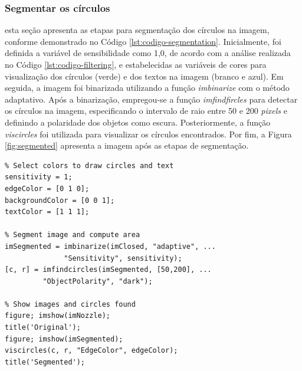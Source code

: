 \documentclass[conference]{IEEEtran}
\begin{document}
\subsubsection{Segmentar os círculos} esta seção apresenta as etapas para segmentação dos círculos na imagem, conforme demonstrado no Código \ref{lst:codigo-segmentation}. Inicialmente, foi definida a variável de sensibilidade como 1,0, de acordo com a análise realizada no Código \ref{lst:codigo-filtering}, e estabelecidas as variáveis de cores para visualização dos círculos (verde) e dos textos na imagem (branco e azul). Em seguida, a imagem foi binarizada utilizando a função \textit{imbinarize} com o método adaptativo. Após a binarização, empregou-se a função \textit{imfindfircles} para detectar os círculos na imagem, especificando o intervalo de raio entre 50 e 200 \textit{pixels} e definindo a polaridade dos objetos como escura. Posteriormente, a função \textit{viscircles} foi utilizada para visualizar os círculos encontrados. Por fim, a Figura \ref{fig:segmented} apresenta a imagem após as etapas de segmentação.

\begin{lstlisting}[caption={Segmentação dos círculos escuros}, label={lst:codigo-segmentation}]
% Select sensitivity to segmentation 
% Select colors to draw circles and text
sensitivity = 1;
edgeColor = [0 1 0];
backgroundColor = [0 0 1];
textColor = [1 1 1];

% Segment image and compute area
imSegmented = imbinarize(imClosed, "adaptive", ...
		      "Sensitivity", sensitivity); 
[c, r] = imfindcircles(imSegmented, [50,200], ...
  	  	 "ObjectPolarity", "dark");

% Show images and circles found
figure; imshow(imNozzle);
title('Original');
figure; imshow(imSegmented);  
viscircles(c, r, "EdgeColor", edgeColor);
title('Segmented');
\end{lstlisting}
\end{document}
